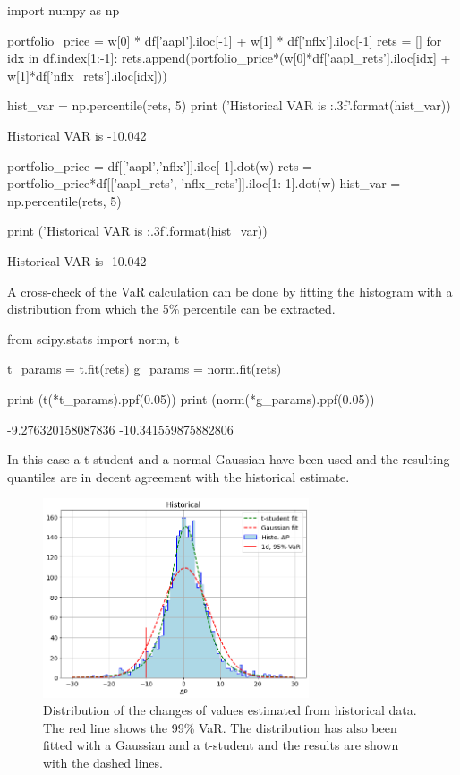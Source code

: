 \begin{ipython}
import numpy as np

portfolio_price = w[0] * df['aapl'].iloc[-1] + w[1] * df['nflx'].iloc[-1]
rets = []
for idx in df.index[1:-1]:
    rets.append(portfolio_price*(w[0]*df['aapl_rets'].iloc[idx] + 
                                 w[1]*df['nflx_rets'].iloc[idx]))

hist_var = np.percentile(rets, 5)
print ('Historical VAR is {:.3f}'.format(hist_var))
\end{ipython}
\begin{ioutput}
Historical VAR is -10.042
\end{ioutput}

\begin{ipython}
portfolio_price = df[['aapl','nflx']].iloc[-1].dot(w)
rets = portfolio_price*df[['aapl_rets', 'nflx_rets']].iloc[1:-1].dot(w)
hist_var = np.percentile(rets, 5)

print ('Historical VAR is {:.3f}'.format(hist_var))
\end{ipython}
\begin{ioutput}
Historical VAR is -10.042
\end{ioutput}

A cross-check of the VaR calculation can be done by fitting the histogram with a distribution from which the 5\% percentile can be extracted.

\begin{ipython}
from scipy.stats import norm, t

t_params = t.fit(rets) 
g_params = norm.fit(rets)

print (t(*t_params).ppf(0.05))
print (norm(*g_params).ppf(0.05))
\end{ipython}
\begin{ioutput}
-9.276320158087836
-10.341559875882806
\end{ioutput}

In this case a t-student and a normal Gaussian have been used and the resulting quantiles are in decent agreement with the historical estimate.

\begin{figure}[htb]
\centering
\includegraphics[width=0.7\textwidth]{figures/historical_var}
\caption{Distribution of the changes of values estimated from historical data. The red line shows the 99\% VaR. The distribution has also been fitted with a Gaussian and a t-student and the results are shown with the dashed lines.}
\label{fig:hist_var}
\end{figure}

